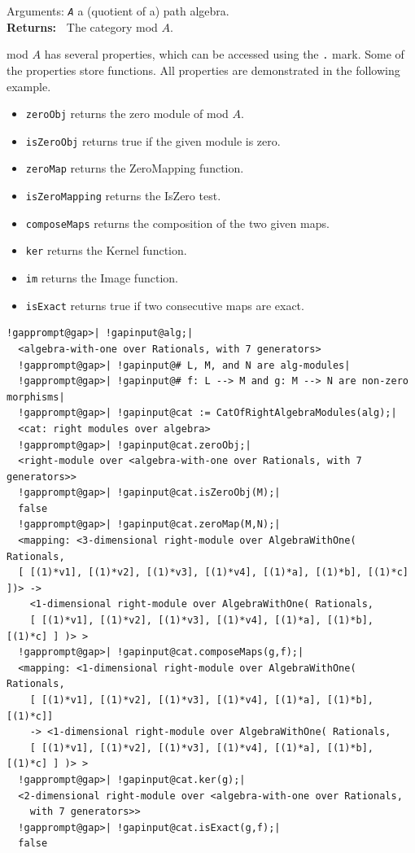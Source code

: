 \documentclass[a4paper,11pt]{report}
\begin{document}
{{{Arguments: \mbox{\texttt{\mdseries\slshape A}} \texttt{}\texttt{} a (quotient of a) path algebra.\\
 \textbf{\indent Returns:\ }
The category mod $A$. 



 mod $A$ has several properties, which can be accessed using the \texttt{.} mark. Some of the properties store functions. All properties are demonstrated
in the following example. 
\begin{itemize}
\item \texttt{zeroObj} \texttt{}\texttt{} returns the zero module of mod $A$.
\item \texttt{isZeroObj} \texttt{}\texttt{} returns true if the given module is
zero.
\item \texttt{zeroMap} \texttt{}\texttt{} returns the ZeroMapping function.
\item \texttt{isZeroMapping} \texttt{}\texttt{} returns the IsZero test.
\item \texttt{composeMaps} \texttt{}\texttt{} returns the composition of the two
given maps.
\item \texttt{ker} \texttt{}\texttt{} returns the Kernel function.
\item \texttt{im} \texttt{}\texttt{} returns the Image function.
\item \texttt{isExact} \texttt{}\texttt{} returns true if two consecutive maps
are exact. 
\end{itemize}
 }

 
\begin{Verbatim}[commandchars=!@|,fontsize=\small,frame=single,label=Example]
  !gapprompt@gap>| !gapinput@alg;|
  <algebra-with-one over Rationals, with 7 generators>
  !gapprompt@gap>| !gapinput@# L, M, and N are alg-modules|
  !gapprompt@gap>| !gapinput@# f: L --> M and g: M --> N are non-zero morphisms|
  !gapprompt@gap>| !gapinput@cat := CatOfRightAlgebraModules(alg);|
  <cat: right modules over algebra>
  !gapprompt@gap>| !gapinput@cat.zeroObj;|
  <right-module over <algebra-with-one over Rationals, with 7 generators>>
  !gapprompt@gap>| !gapinput@cat.isZeroObj(M);|
  false
  !gapprompt@gap>| !gapinput@cat.zeroMap(M,N);|
  <mapping: <3-dimensional right-module over AlgebraWithOne( Rationals, 
  [ [(1)*v1], [(1)*v2], [(1)*v3], [(1)*v4], [(1)*a], [(1)*b], [(1)*c] ])> -> 
    <1-dimensional right-module over AlgebraWithOne( Rationals,
    [ [(1)*v1], [(1)*v2], [(1)*v3], [(1)*v4], [(1)*a], [(1)*b], [(1)*c] ] )> >
  !gapprompt@gap>| !gapinput@cat.composeMaps(g,f);|
  <mapping: <1-dimensional right-module over AlgebraWithOne( Rationals, 
    [ [(1)*v1], [(1)*v2], [(1)*v3], [(1)*v4], [(1)*a], [(1)*b], [(1)*c]]
    -> <1-dimensional right-module over AlgebraWithOne( Rationals,
    [ [(1)*v1], [(1)*v2], [(1)*v3], [(1)*v4], [(1)*a], [(1)*b], [(1)*c] ] )> >
  !gapprompt@gap>| !gapinput@cat.ker(g);|
  <2-dimensional right-module over <algebra-with-one over Rationals,
    with 7 generators>>
  !gapprompt@gap>| !gapinput@cat.isExact(g,f);|
  false 
\end{Verbatim}
 }

}
\end{document}
